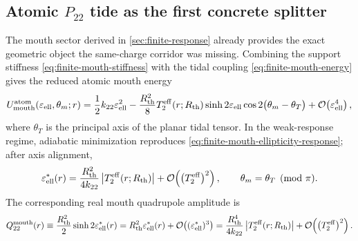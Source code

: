 \documentclass[11pt]{article}
\theoremstyle{plain}
\theoremstyle{definition}
\theoremstyle{remark}
\newcommand{\Ptwotwo}{P_{22}}
\newcommand{\Rth}{R_{\mathrm{th}}}
\newcommand{\epsell}{\varepsilon_{\mathrm{ell}}}
\newcommand{\thmouth}{\theta_m}
\newcommand{\Order}[1]{\mathcal{O}\!\left(#1\right)}
\begin{document}
\subsection{Atomic \texorpdfstring{$\Ptwotwo$}{P22} tide as the first concrete splitter}\label{subsec:bridge-atomic-splitter}

The mouth sector derived in \cref{sec:finite-response} already provides the exact geometric object the same-charge corridor was missing. Combining the support stiffness \cref{eq:finite-mouth-stiffness} with the tidal coupling \cref{eq:finite-mouth-energy} gives the reduced atomic mouth energy
\begin{equation}
U_{\rm mouth}^{\rm atom}(\epsell,\thmouth;r)
=
\frac12 k_{22}\epsell^2
-\frac{\Rth^2}{8}T_2^{\rm eff}(r;\Rth)\sinh 2\epsell\cos 2\bigl(\thmouth-\theta_T\bigr)
+\Order{\epsell^4},
\label{eq:bridge-atomic-mouth-energy}
\end{equation}
where \(\theta_T\) is the principal axis of the planar tidal tensor. In the weak-response regime, adiabatic minimization reproduces \cref{eq:finite-mouth-ellipticity-response}; after axis alignment,
\begin{equation}
\epsell^{*}(r)
=
\frac{\Rth^2}{4k_{22}}\,\bigl|T_2^{\rm eff}(r;\Rth)\bigr|
+\Order{\bigl(T_2^{\rm eff}\bigr)^2},
\qquad
\thmouth=\theta_T\pmod{\pi}.
\label{eq:bridge-epsell-star}
\end{equation}
The corresponding real mouth quadrupole amplitude is
\begin{equation}
Q_{22}^{\rm mouth}(r)
\equiv
\frac{\Rth^2}{2}\sinh 2\epsell^{*}(r)
=
\Rth^2\epsell^{*}(r)+\Order{(\epsell^{*})^3}
=
\frac{\Rth^4}{4k_{22}}\,\bigl|T_2^{\rm eff}(r;\Rth)\bigr|
+\Order{\bigl(T_2^{\rm eff}\bigr)^2}.
\label{eq:bridge-mouth-Q22-star}
\end{equation}
\end{document}
